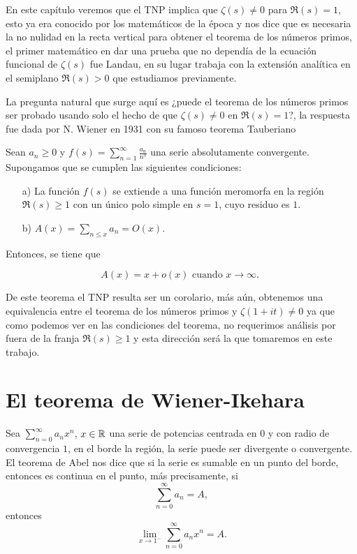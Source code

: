En este capítulo veremos que el TNP implica que $\zeta(s)\neq 0$ para $\Re(s)=1$, esto ya era conocido por los matemáticos de la época y nos dice que es necesaria la no nulidad en la recta vertical para obtener el teorema de los números primos, el primer matemático en dar una prueba que no dependía de la ecuación funcional de $\zeta(s)$ fue Landau, en su lugar trabaja con la extensión analítica en el semiplano $\Re(s)>0$ que estudiamos previamente.

La pregunta natural que surge aquí es ¿puede el teorema de los números primos ser probado usando solo el hecho de que $\zeta(s)\neq 0$ en $\Re(s)=1$?, la respuesta fue dada por N. Wiener en 1931 con su famoso teorema Tauberiano


\begin{theorem}
Sean $a_n \geq 0$ y $f(s)=\displaystyle\sum_{n=1}^{\infty} \frac{a_n}{n^s}$ una serie absolutamente convergente. Supongamos que se cumplen las siguientes condiciones:

\begin{itemize}
\item[a)] La función $f(s)$ se extiende a una función meromorfa en la región $\Re(s) \geq 1$ con un único polo simple en $s=1$, cuyo residuo es $1$.
\item[b)] $A(x)=\displaystyle \sum_{n \leq x} a_n=O(x)$.
\end{itemize}


Entonces, se tiene que

$$
A(x)=x+o(x) \text { cuando } x \rightarrow \infty \text {. }
$$
\end{theorem}

De este teorema el TNP resulta ser un corolario, más aún, obtenemos una equivalencia entre el teorema de los números primos y $\zeta(1+it)\neq 0$ ya que como podemos ver en las condiciones del teorema, no requerimos análisis por fuera de la franja $\Re(s)\geq 1$ y esta dirección será la que tomaremos en este trabajo.

\section{El teorema de Wiener-Ikehara}

Sea $\displaystyle \sum_{n=0}^{\infty} a_n x^n$, $x\in \mathbb{R}$ una serie de potencias centrada en $0$ y con radio  de convergencia $1$, en el borde la región, la serie puede ser divergente o convergente. El teorema de Abel nos dice que si la serie es sumable en un punto del borde, entonces es continua en el punto, más precisamente, si
$$\sum_{n=0}^{\infty} a_n=A,$$
entonces
$$\lim_{x \to 1^-}\sum_{n=0}^{\infty} a_n x^n=A.$$

